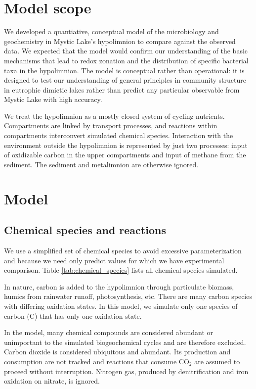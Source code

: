 \documentclass{report}
\begin{document}
\section{Model scope}
We developed a quantiative, conceptual model of the microbiology and geochemistry in Mystic Lake's
hypolimnion to compare against the observed data. We expected that the model would confirm
our understanding of the basic mechanisms that lead to redox zonation and the distribution
of specific bacterial taxa in the hypolimnion. The model is conceptual rather than operational: it
is designed to test our understanding of general principles in community structure in
eutrophic dimictic lakes rather than predict any particular observable from Mystic Lake with
high accuracy.

We treat the hypolimnion as a mostly closed system of cycling nutrients. Compartments are
linked by transport processes, and reactions within compartments interconvert simulated chemical
species. Interaction with the environment outside the hypolimnion is represented by just two
processes: input of oxidizable carbon in the upper compartments and input of methane from
the sediment. The sediment and metalimnion are otherwise ignored.

\section{Model}
\subsection{Chemical species and reactions}
We use a simplified set of chemical species to avoid excessive parameterization and
because we need only predict values for which we have experimental comparison. Table
\ref{tab:chemical_species} lists all chemical species simulated.

In nature, carbon is added to the hypolimnion through particulate biomass, humics from
rainwater runoff, photosynthesis,
etc. There are many carbon species with differing oxidation states. In this model, we 
simulate only one species of carbon (C) that has only one oxidation state.

In the model, many chemical compounds are considered abundant or unimportant to the simulated biogeochemical cycles and are therefore excluded. Carbon dioxide is considered ubiquitous and abundant. Its production and consumption are not tracked and reactions that consume
CO$_2$ are assumed to proceed without interruption. Nitrogen gas, produced by denitrification
and iron oxidation on nitrate, is ignored.
\end{document}
